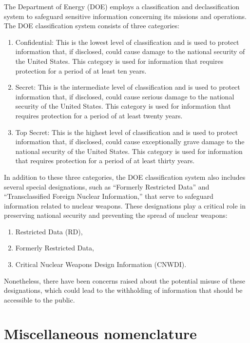 The Department of Energy (DOE) employs a classification and declassification system to safeguard sensitive information concerning
its missions and operations. The DOE classification system consists of three categories:
\begin{enumerate}
\item
Confidential: This is the lowest level of classification and is used to protect information that, if disclosed, could cause damage to the national security of the United States. This category is used for information that requires protection for a period of at least ten years.

\item
Secret: This is the intermediate level of classification and is used to protect information that, if disclosed, could cause serious damage to the national security of the United States. This category is used for information that requires protection for a period of at least twenty years.

\item
Top Secret: This is the highest level of classification and is used to protect information that, if disclosed, could cause exceptionally grave damage to the national security of the United States. This category is used for information that requires protection for a period of at least thirty years.
\end{enumerate}


In addition to these three categories, the DOE classification system also includes several special designations, such as ``Formerly Restricted Data'' and ``Transclassified Foreign Nuclear Information,'' that serve to safeguard information related to nuclear weapons. These designations play a critical role in preserving national security and preventing the spread of nuclear weapons:
\begin{enumerate}
\item
Restricted Data (RD),

\item
Formerly Restricted Data,

\item
Critical Nuclear Weapons Design Information (CNWDI).
\end{enumerate}

Nonetheless, there have been concerns raised about the potential misuse of these designations, which could lead to the withholding of information that should be accessible to the public.


\section{Miscellaneous nomenclature}
\label{2023-UFO-part-Perception-crash-retreivals-MN}

